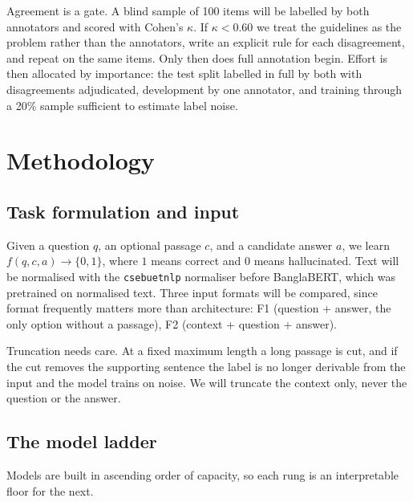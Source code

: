 \documentclass[12pt,a4paper]{article}
\begin{document}
Agreement is a gate. A blind sample of 100 items will be labelled by
both annotators and scored with Cohen's $\kappa$. If $\kappa < 0.60$ we treat the
guidelines as the problem rather than the annotators, write an explicit rule for
each disagreement, and repeat on the same items. Only then does full annotation
begin. Effort is then allocated by importance: the test split labelled in full
by both with disagreements adjudicated, development by one annotator, and
training through a 20\% sample sufficient to estimate label noise.

\section{Methodology}
\label{sec:methodology}

\subsection{Task formulation and input}

Given a question $q$, an optional passage $c$, and a candidate answer $a$, we
learn $f(q, c, a) \rightarrow \{0, 1\}$, where $1$ means correct and
$0$ means hallucinated. Text will be normalised with the \texttt{csebuetnlp} normaliser before
BanglaBERT, which was pretrained on normalised text. Three input formats will be
compared, since format frequently matters more than architecture: F1
(question + answer, the only option without a passage), F2 (context +
question + answer).

Truncation needs care. At a fixed maximum length a long passage is cut,
and if the cut removes the supporting sentence the label is no longer derivable
from the input and the model trains on noise. We will truncate the
context only, never the question or the answer.

\subsection{The model ladder}

Models are built in ascending order of capacity, so each rung is an
interpretable floor for the next.
\end{document}
